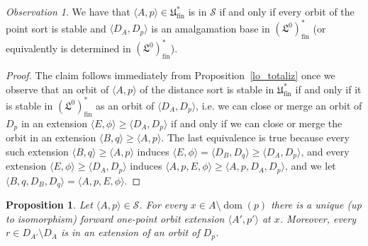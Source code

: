 \documentclass[10pt,a4paper]{article}
\newtheorem{prop}[tw]{Proposition}
\theoremstyle{definition}
\theoremstyle{remark}
\newtheorem{observation}[tw]{Observation}
\newcommand \seq [1]{\langle #1 \rangle}
\newcommand \dom {\operatorname{dom}}
\newcommand \Su {\mathscr{S}}
\newcommand \fin {{\operatorname{fin}}}
\newcommand \Lin {\mathfrak{L}}
\newcommand \Ult {\mathfrak{U}}
\begin{document}
\begin{observation} \label{distance_sort_stable}
    We have that $\seq{A, p} \in \Ult^*_\fin$ is in $\Su$ if and only if every orbit of the point sort is stable and $\seq{D_A, D_p}$ is an amalgamation base in $(\Lin^0)^*_\fin$ (or equivalently is determined in $(\Lin^0)^*_\fin$).
\end{observation}
\begin{proof}
    The claim follows immediately from Proposition~\ref{lo_totaliz} once we observe that an orbit of $\seq{A, p}$ of the distance sort is stable in $\Ult^*_\fin$ if and only if it is stable in $(\Lin^0)^*_\fin$ as an orbit of $\seq{D_A, D_p}$, i.e. we can close or merge an orbit of $D_p$ in an extension $\seq{E, \phi} \geq \seq{D_A, D_p}$ if and only if we can close or merge the orbit in an extension $\seq{B, q} \geq \seq{A, p}$.
    The last equivalence is true because every such extension $\seq{B, q} \geq \seq{A, p}$ induces $\seq{E, \phi} = \seq{D_B, D_q} \geq \seq{D_A, D_p}$, and every extension $\seq{E, \phi} \geq \seq{D_A, D_p}$ induces $\seq{A, p, E, \phi} \geq \seq{A, p, D_A, D_p}$, and we let $\seq{B, q, D_B, D_q} = \seq{A, p, E, \phi}$.
\end{proof}

\begin{prop} \label{thm:unique_onepoint_extension}
    Let $\seq{A, p} \in \Su$.
    For every $x \in A \setminus \dom(p)$ there is a unique (up to isomorphism) forward one-point orbit extension $\seq{A', p'}$ at $x$.
    Moreover, every $r \in D_{A'} \setminus D_A$ is in an extension of an orbit of $D_p$.
\end{prop}
\end{document}
